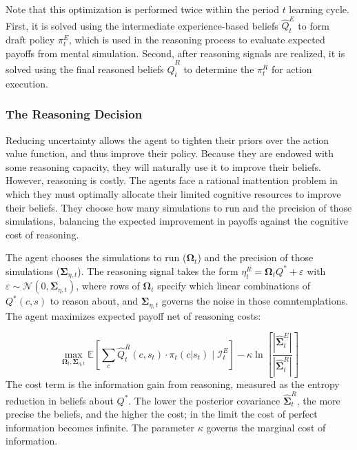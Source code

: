  Note
that this optimization is performed twice within the period $t$ learning cycle. First, 
it is solved using the intermediate experience-based beliefs $\hat{Q}^E_t$ to form draft policy $\pi^E_t$,
which is used in the reasoning process to evaluate expected payoffs from mental simulation.
Second, after reasoning signals are realized, it is solved using the final reasoned beliefs $\hat{Q}^R_t$ 
to determine the $\pi^R_t$ for action execution.

\subsubsection{The Reasoning Decision}\label{sec:reasoning-decision}

Reducing uncertainty allows the agent to tighten their priors over the action value function,
and thus improve their policy. Because they are endowed with some reasoning capacity, they
will naturally use it to improve their beliefs. However, reasoning is costly.
The agents face a rational inattention problem in which they must optimally allocate their limited
cognitive resources to improve their beliefs. They choose how many simulations to run
and the precision of those simulations, balancing the expected improvement in payoffs
against the cognitive cost of reasoning.

The agent chooses the simulations to run ($\boldsymbol{\Omega}_t$) and the precision of 
those simulations ($\boldsymbol{\Sigma}_{\eta, t}$). The reasoning signal takes the 
form $\eta^R_t = \boldsymbol{\Omega}_t Q^* + \varepsilon$ with $\varepsilon 
\sim \mathcal{N}(0, \boldsymbol{\Sigma}_{\eta,t})$, where rows of $\boldsymbol{\Omega}_t$ 
specify which linear combinations of $Q^*(c,s)$ to reason about, and $\boldsymbol{\Sigma}_{\eta,t}$ 
governs the noise in those comntemplations. The agent maximizes expected payoff net of reasoning costs:

\begin{equation}
\max_{\boldsymbol{\Omega}_t, \boldsymbol{\Sigma}_{\eta, t}} \mathbb{E}\left[ \sum_c \hat{Q}^R_t(c, s_t) \cdot \pi_t(c | s_t) \mid \mathcal{I}^E_t \right] - \kappa \ln\left[\frac{|\hat{\boldsymbol{\Sigma}}^E_t|}{|\hat{\boldsymbol{\Sigma}}^R_t|}\right]
\end{equation}
The cost term is the information gain from reasoning, measured as the entropy reduction in beliefs about $Q^*$. The lower the posterior covariance $\hat{\boldsymbol{\Sigma}}^R_t$, the more precise the beliefs, and the higher the cost; in the limit the cost of perfect information becomes infinite. The parameter $\kappa$ governs the marginal cost of information.

